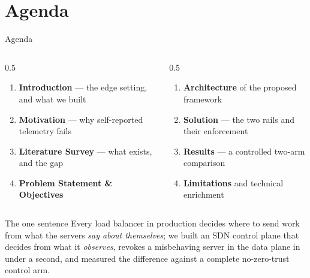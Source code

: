 \documentclass[aspectratio=169, 11pt]{beamer}
\begin{document}
\section{Agenda}
\begin{frame}{Agenda}
    \vspace{2pt}
    \begin{columns}[T]
      \begin{column}{0.5\textwidth}
        \footnotesize
        \begin{enumerate}\itemsep4pt
          \item \textbf{Introduction} --- the edge setting, and what we built
          \item \textbf{Motivation} --- why self-reported telemetry fails
          \item \textbf{Literature Survey} --- what exists, and the gap
          \item \textbf{Problem Statement \& Objectives}
        \end{enumerate}
      \end{column}
      \begin{column}{0.5\textwidth}
        \footnotesize
        \begin{enumerate}\itemsep4pt
          \setcounter{enumi}{4}
          \item \textbf{Architecture} of the proposed framework
          \item \textbf{Solution} --- the two rails and their enforcement
          \item \textbf{Results} --- a controlled two-arm comparison
          \item \textbf{Limitations} and technical enrichment
        \end{enumerate}
      \end{column}
    \end{columns}

    \vspace{10pt}
    \begin{block}{\footnotesize The one sentence}
      \footnotesize
      Every load balancer in production decides where to send work from what the
      servers \emph{say about themselves}; we built an SDN control plane that
      decides from what it \emph{observes}, revokes a misbehaving server in the
      data plane in under a second, and measured the difference against a
      complete no-zero-trust control arm.
    \end{block}
\end{frame}
\end{document}
